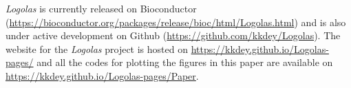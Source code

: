 \documentclass{bmcart}
\begin{document}
\textit{Logolas} is currently released on Bioconductor (\url{https://bioconductor.org/packages/release/bioc/html/Logolas.html}) and is also under active development on Github (\url{https://github.com/kkdey/Logolas}). The website for the \textit{Logolas} project is hosted on \url{https://kkdey.github.io/Logolas-pages/} and all the codes for plotting the figures in this paper are available on \url{https://kkdey.github.io/Logolas-pages/Paper}. 



\end{document}
